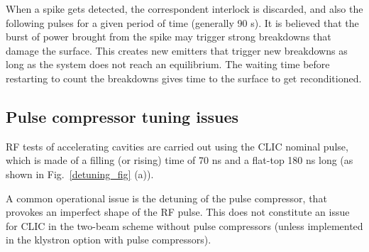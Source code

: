 When a spike gets detected, the correspondent interlock is discarded, and also the following pulses for a given period of time (generally 90 s). It is believed that the burst of power brought from the spike may trigger strong breakdowns that damage the surface. This creates new emitters that trigger new breakdowns as long as the system does not reach an equilibrium. The waiting time before restarting to count the breakdowns gives time to the surface to get reconditioned.


\subsection[Pulse compressor tuning issues]{Pulse compressor tuning issues}
\label{sec:PCtune}

RF tests of accelerating cavities are carried out using the CLIC nominal pulse, which is made of a filling (or rising) time of 70 ns and a flat-top 180 ns long (as shown in Fig.~\ref{detuning_fig} (a)).

A common operational issue is the detuning of the pulse compressor, that provokes an imperfect shape of the RF pulse. This does not constitute an issue for CLIC in the two-beam scheme without pulse compressors (unless implemented in the klystron option with pulse compressors). 


